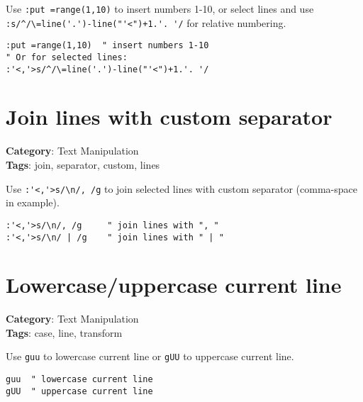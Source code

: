 {{{{{{{{{{{{{{Use {\footnotesize \Verb§:put =range(1,10)§} to insert numbers 1-10, or select lines and use {\footnotesize \Verb§:s/^/\=line('.')-line("'<")+1.'. '/§} for relative numbering.

\begin{Exa*}{}
\begin{Verbatim}[fontsize=\footnotesize, breaklines, breakanywhere]
:put =range(1,10)  " insert numbers 1-10
" Or for selected lines:
:'<,'>s/^/\=line('.')-line("'<")+1.'. '/
\end{Verbatim}
\end{Exa*}

\section{Join lines with custom separator}

\textbf{Category}: Text Manipulation\\ \textbf{Tags}: join, separator, custom, lines
\vspace{0.5cm}

Use {\footnotesize \Verb§:'<,'>s/\n/, /g§} to join selected lines with custom separator (comma-space in example).

\begin{Exa*}{}
\begin{Verbatim}[fontsize=\footnotesize, breaklines, breakanywhere]
:'<,'>s/\n/, /g     " join lines with ", "
:'<,'>s/\n/ | /g    " join lines with " | "
\end{Verbatim}
\end{Exa*}

\section{Lowercase/uppercase current line}

\textbf{Category}: Text Manipulation\\ \textbf{Tags}: case, line, transform
\vspace{0.5cm}

Use {\footnotesize \Verb§guu§} to lowercase current line or {\footnotesize \Verb§gUU§} to uppercase current line.

\begin{Exa*}{}
\begin{Verbatim}[fontsize=\footnotesize, breaklines, breakanywhere]
guu  " lowercase current line
gUU  " uppercase current line
\end{Verbatim}
\end{Exa*}

}}}}}}}}}}}}}}
